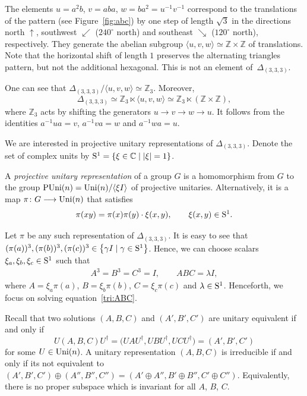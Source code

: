 \documentclass[pdftex]{sigma}
\numberwithin{equation}{section}
\newcommand{\ea}[1]{\begin{align}#1\end{align}}
\newcommand{\la}{\langle}
\newcommand{\ra}{\rangle}
\newcommand{\mbb}{\mathbb}
\begin{document}
The elements $u=a^2b$, $v=aba$, $w=ba^2=u^{-1}v^{-1}$ correspond to the translations
of the pattern (see Figure~\ref{fig:abc}) by one step of length $\sqrt{3}$
in the directions north $\uparrow$,
southwest $\swarrow$ ($240^\circ$ north) and
southeast $\searrow$ ($120^\circ$ north), respectively.
They generate the abelian subgroup $\la u,v,w \ra \simeq \mbb{Z} \times \mbb{Z}$
of translations.
Note that the horizontal shift of length $1$ preserves the alternating triangles pattern,
but not the additional hexagonal. This is not an element of~$\Delta_{(3,3,3)}$.

One can see that
$\Delta_{(3,3,3)}/\la u,v,w \ra \simeq \mbb{Z}_3$.
Moreover,
\[
\Delta_{(3,3,3)} \simeq \mbb{Z}_3 \ltimes \la u,v,w \ra
\simeq \mbb{Z}_3 \ltimes (\mbb{Z} \times \mbb{Z}),
\]
where $\mbb{Z}_3$ acts by shifting the generators $u \rightarrow v \rightarrow w \rightarrow u$.
It follows from the identities $a^{-1}ua = v$, $a^{-1}va = w$ and $a^{-1}wa = u$.

We are interested in projective unitary representations of $\Delta_{(3,3,3)}$.
Denote the set of complex units by ${\rm S}^1 = \{\xi \in \mbb{C} \mid |\xi| = 1 \}$.

A \textit{projective unitary representation} of a group $G$
is a homomorphism from $G$ to the group
${\rm PUni}(n) = {\rm Uni}(n)/\la \xi I\ra$ of projective unitaries.
Alternatively, it is a map $\pi\colon G \longrightarrow {\rm Uni}(n)$ that satisfies
\begin{align*}
\pi(xy) = \pi(x)\pi(y) \cdot \xi(x, y),
\qquad
\xi(x, y) \in {\rm S}^1.
\end{align*}

Let $\pi$ be any such representation of $\Delta_{(3,3,3)}$.
It is easy to see that $(\pi(a))^3, (\pi(b))^3, (\pi(c))^3 \in \bigl\{ \gamma I \mid \gamma \in {\rm S}^1\bigr\}$.
Hence, we can choose scalars $\xi_a, \xi_b, \xi_c \in {\rm S}^1$ such that
\ea{\label{tri:ABC}
A^3 = B^3 = C^3 = I,\qquad ABC = \lambda I,
}
where $A = \xi_a\pi(a)$, $B = \xi_b\pi(b)$, $C = \xi_c\pi(c)$ and $\lambda \in {\rm S}^1$.
Henceforth, we focus on solving equation~\eqref{tri:ABC}.

Recall that two solutions $(A,B,C)$ and $(A',B',C')$
are unitary equivalent if and only if
\[
U(A,B,C)U^\dag = \bigl(UAU^\dag,UBU^\dag,UCU^\dag\bigr) = (A',B',C')
\]
for some $U \in {\rm Uni}(n)$.
A unitary representation $(A,B,C)$ is irreducible if and only if its not equivalent to
$(A',B',C') \oplus (A'',B'',C'') = (A'\oplus A'',B'\oplus B'',C'\oplus C'')$.
Equivalently, there is no proper subspace which is invariant for all $A$, $B$, $C$.
\end{document}
